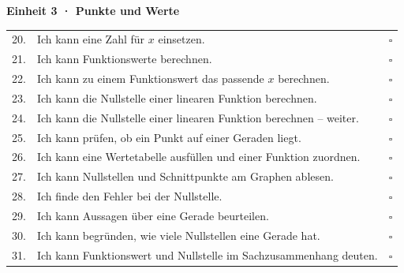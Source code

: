 \par\medskip\noindent\begin{minipage}{\linewidth}
\textbf{Einheit 3 · Punkte und Werte}\par\smallskip
\noindent\begin{tabular}{@{}p{7mm} p{14cm} c@{}}
\hfill 20. & Ich kann eine Zahl für $x$ einsetzen. & $\square$ \\
\hfill 21. & Ich kann Funktionswerte berechnen. & $\square$ \\
\hfill 22. & Ich kann zu einem Funktionswert das passende $x$ berechnen. & $\square$ \\
\hfill 23. & Ich kann die Nullstelle einer linearen Funktion berechnen. & $\square$ \\
\hfill 24. & Ich kann die Nullstelle einer linearen Funktion berechnen – weiter. & $\square$ \\
\hfill 25. & Ich kann prüfen, ob ein Punkt auf einer Geraden liegt. & $\square$ \\
\hfill 26. & Ich kann eine Wertetabelle ausfüllen und einer Funktion zuordnen. & $\square$ \\
\hfill 27. & Ich kann Nullstellen und Schnittpunkte am Graphen ablesen. & $\square$ \\
\hfill 28. & Ich finde den Fehler bei der Nullstelle. & $\square$ \\
\hfill 29. & Ich kann Aussagen über eine Gerade beurteilen. & $\square$ \\
\hfill 30. & Ich kann begründen, wie viele Nullstellen eine Gerade hat. & $\square$ \\
\hfill 31. & Ich kann Funktionswert und Nullstelle im Sachzusammenhang deuten. & $\square$ \\
\end{tabular}
\end{minipage}
